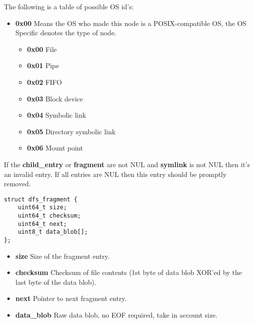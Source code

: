\documentclass[12pt]{article}
\begin{document}
The following is a table of possible OS id's:
\begin{itemize}
	\item \textbf{0x00} Means the OS who made this node is a POSIX-compatible OS, the OS Specific denotes the type of node.
	\begin{itemize}
		\item \textbf{0x00} File
	\end{itemize}
	\begin{itemize}
		\item \textbf{0x01} Pipe
	\end{itemize}
	\begin{itemize}
		\item \textbf{0x02} FIFO
	\end{itemize}
	\begin{itemize}
		\item \textbf{0x03} Block device
	\end{itemize}
	\begin{itemize}
		\item \textbf{0x04} Symbolic link
	\end{itemize}
	\begin{itemize}
		\item \textbf{0x05} Directory symbolic link
	\end{itemize}
	\begin{itemize}
		\item \textbf{0x06} Mount point
	\end{itemize}
\end{itemize}

If the \textbf{child\_entry} or \textbf{fragment} are not NUL and \textbf{symlink} is not NUL then it's an invalid entry. If all entries are NUL then this entry should be promptly removed.

\begin{verbatim}
struct dfs_fragment {
	uint64_t size;
	uint64_t checksum;
	uint64_t next;
	uint8_t data_blob[];
};
\end{verbatim}

\begin{itemize}
	\item \textbf{size} Size of the fragment entry.
	\item \textbf{checksum} Checksum of file contents (1st byte of data blob XOR'ed by the last byte of the data blob).
	\item \textbf{next} Pointer to next fragment entry.
	\item \textbf{data\_blob} Raw data blob, no EOF required, take in account size.
\end{itemize}
\end{document}
